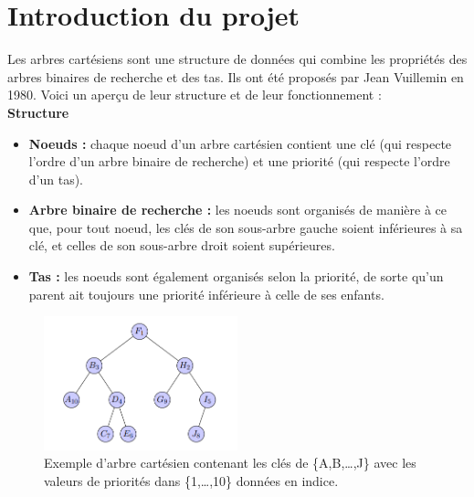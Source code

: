 \documentclass[a4paper,12pt]{report}
\begin{document}

\tableofcontents






\newpage

\chapter*{Introduction du projet}

Les arbres cartésiens sont une structure de données qui combine les propriétés des arbres binaires de recherche et des tas. Ils ont été proposés par Jean 
    Vuillemin en 1980. Voici un aperçu de leur structure et de leur fonctionnement :\\[-0.4cm]


\textbf{Structure}
\begin{itemize}

    \item \textbf{Noeuds :} chaque noeud d'un arbre cartésien contient une clé (qui respecte l'ordre d'un arbre binaire de recherche) 
        et une priorité (qui respecte l'ordre d'un tas).

    \item \textbf{Arbre binaire de recherche :} les noeuds sont organisés de manière à ce que, pour tout noeud, les clés de son 
        sous-arbre gauche soient inférieures à sa clé, et celles de son sous-arbre droit soient supérieures.

    \item \textbf{Tas :} les noeuds sont également organisés selon la priorité, de sorte qu'un parent ait toujours une priorité inférieure 
        à celle de ses enfants.

\end{itemize}


\begin{figure}[!h]
    \centering
    \includegraphics[width=0.5\textwidth]{../images/figure1.png}
    \caption{Exemple d'arbre cartésien contenant les clés de \{A,B,\dots,J\} avec les valeurs de priorités dans \{1,\dots,10\} données en indice.}
\end{figure}
\end{document}
